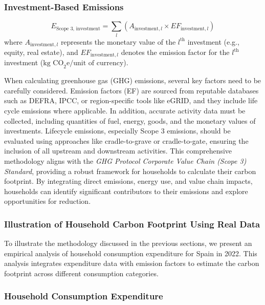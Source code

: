 \documentclass[12pt,a4paper]{article}
\begin{document}
\subsubsection*{Investment-Based Emissions}
\begin{equation}
E_{\text{Scope 3, investment}} = \sum_{l} \left( A_{\text{investment}, l} \times EF_{\text{investment}, l} \right)
\end{equation}
where \(A_{\text{investment}, l}\) represents the monetary value of the \(l^{\text{th}}\) investment (e.g., equity, real estate), and \(EF_{\text{investment}, l}\) denotes the emission factor for the \(l^{\text{th}}\) investment (\(\text{kg CO}_2\text{e}/\text{unit of currency}\)).


When calculating greenhouse gas (GHG) emissions, several key factors need to be carefully considered. Emission factors (EF) are sourced from reputable databases such as DEFRA, IPCC, or region-specific tools like eGRID, and they include life cycle emissions where applicable. In addition, accurate activity data must be collected, including quantities of fuel, energy, goods, and the monetary values of investments. Lifecycle emissions, especially Scope 3 emissions, should be evaluated using approaches like cradle-to-grave or cradle-to-gate, ensuring the inclusion of all upstream and downstream activities. This comprehensive methodology aligns with the \textit{GHG Protocol Corporate Value Chain (Scope 3) Standard}, providing a robust framework for households to calculate their carbon footprint. By integrating direct emissions, energy use, and value chain impacts, households can identify significant contributors to their emissions and explore opportunities for reduction.

\subsubsection{Illustration of Household Carbon Footprint Using Real Data}

To illustrate the methodology discussed in the previous sections, we present an empirical analysis of household consumption expenditure for Spain in 2022. This analysis integrates expenditure data with emission factors to estimate the carbon footprint across different consumption categories.

\subsubsection*{Household Consumption Expenditure}
\end{document}
